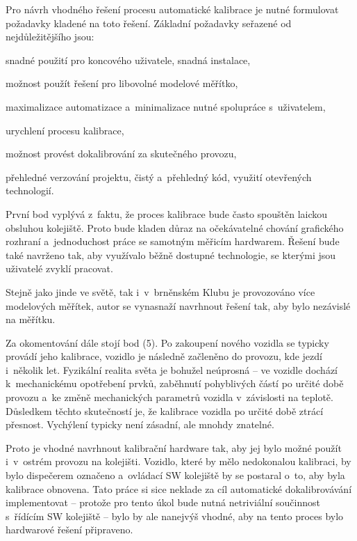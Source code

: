 Pro návrh vhodného řešení procesu automatické kalibrace je nutné formulovat
požadavky kladené na toto řešení. Základní požadavky seřazené od
nejdůležitějšího jsou:

\begin{compactenum}
	\item snadné použití pro koncového uživatele, snadná instalace,
	\item možnost použít řešení pro libovolné modelové měřítko,
	\item maximalizace automatizace a~minimalizace nutné spolupráce s~uživatelem,
	\item urychlení procesu kalibrace,
	\item možnost provést dokalibrování za skutečného provozu,
	\item přehledné verzování projektu, čistý a~přehledný kód, využití otevřených
	technologií.
\end{compactenum}

První bod vyplývá z~faktu, že proces kalibrace bude často spouštěn laickou obsluhou
kolejiště. Proto bude kladen důraz na očekávatelné chování grafického
rozhraní a~jednoduchost práce se samotným měřicím hardwarem. Řešení bude také
navrženo tak, aby využívalo běžně dostupné technologie, se kterými jsou
uživatelé zvyklí pracovat.

Stejně jako jinde ve světě, tak i~v~brněnském Klubu je provozováno více
modelových měřítek, autor se vynasnaží navrhnout řešení tak, aby bylo nezávislé
na měřítku.

Za okomentování dále stojí bod (5). Po zakoupení nového vozidla se
typicky provádí jeho kalibrace, vozidlo je následně začleněno do provozu, kde
jezdí i~několik let. Fyzikální realita světa je bohužel neúprosná --
ve vozidle dochází k~mechanickému opotřebení prvků, zaběhnutí pohyblivých
částí po určité době provozu a~ke změně mechanických parametrů vozidla
v~závislosti na teplotě. Důsledkem těchto skutečností je, že kalibrace vozidla
po určité době ztrácí přesnost. Vychýlení typicky není zásadní, ale mnohdy
znatelné.

Proto je vhodné navrhnout kalibrační hardware tak, aby jej bylo možné použít
i~v~ostrém provozu na kolejišti. Vozidlo, které by mělo nedokonalou kalibraci,
by bylo dispečerem označeno a~ovládací SW kolejiště by se postaral o~to, aby byla
kalibrace obnovena. Tato práce si sice neklade za cíl automatické
dokalibrovávání implementovat -- protože pro tento úkol bude nutná netriviální
součinnost s~řídícím SW kolejiště -- bylo by ale nanejvýš vhodné, aby na tento
proces bylo hardwarové řešení připraveno.
